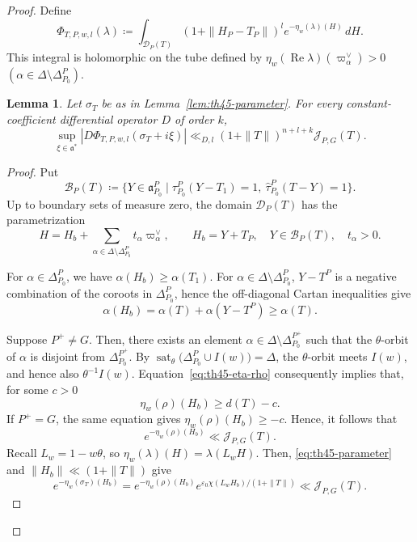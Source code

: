 \documentclass[12pt]{amsart}
\theoremstyle{definition}
\theoremstyle{plain}
\newtheorem{lemma}[definition]{Lemma}
\theoremstyle{remark}
\newcommand{\fa}{\mathfrak{a}}
\newcommand{\cJ}{\mathcal{J}}
\numberwithin{equation}{section}
\begin{document}
\begin{proof}
Define
\[
 \Phi_{T,P,w,l}(\lambda)
 \coloneqq \int_{\mathcal D_P(T)}
   (1+\|H_P-T_P\|)^l e^{-\eta_w(\lambda)(H)}\,dH.
\]
This integral is holomorphic on the tube defined by $\eta_w(\operatorname{Re}\lambda)(\varpi_\alpha^\vee)>0$ $(\alpha\in\Delta\setminus\Delta_{P_0}^P)$. 
\begin{lemma}
\label{lem:th45-cone}
Let $\sigma_T$ be as in Lemma~\ref{lem:th45-parameter}. 
For every constant-coefficient differential operator \(D\) of
order \(k\),
\begin{equation}\label{eq:th45-cone-bound}
 \sup_{\xi\in\fa^*}
 |D\Phi_{T,P,w,l}(\sigma_T+i\xi)|
 \ll_{D,l} (1+\|T\|)^{n+l+k}\cJ_{P,G}(T).
\end{equation}
\end{lemma}

\begin{proof}
Put
\[
 \mathcal B_P(T)\coloneqq
 \{Y\in\fa_{P_0}^P\mid
   \tau_{P_0}^P(Y-T_1)=1,\ 
   \widehat\tau_{P_0}^P(T-Y)=1\}.
\]
Up to boundary sets of measure zero, the domain \(\mathcal D_P(T)\)
has the parametrization
\begin{equation}\label{eq:th45-cone-coordinates}
 H=H_b+\sum_{\alpha\in\Delta\setminus\Delta_{P_0}^P}
               t_\alpha\varpi_\alpha^\vee,
 \qquad H_b=Y+T_P,\quad Y\in\mathcal B_P(T),\quad t_\alpha>0.
\end{equation}


For $\alpha\in\Delta_{P_0}^P$, we have $\alpha(H_b)\geq\alpha(T_1)$.
For $\alpha\in\Delta\setminus \Delta_{P_0}^P$, $Y-T^P$ is a negative combination of the coroots in
$\Delta_{P_0}^P$, hence the off-diagonal Cartan inequalities give
\[
 \alpha(H_b)=\alpha(T)+\alpha(Y-T^P)\geq\alpha(T).
\]


Suppose $P^+\neq G$. 
Then, there exists an element $\alpha\in\Delta\setminus \Delta_{P_0}^{P^+}$ such that the $\theta$-orbit of $\alpha$ is disjoint from $\Delta_{P_0}^{P^+}$.
By $\operatorname{sat}_\theta\bigl(\Delta_{P_0}^P\cup I(w)\bigr)=\Delta$, the $\theta$-orbit meets $I(w)$, and hence also
$\theta^{-1}I(w)$.
Equation~\eqref{eq:th45-eta-rho} consequently implies that, for some $c>0$
\[
\eta_w(\rho)(H_b)\geq d(T)-c. 
\]
If $P^+=G$, the same equation gives $\eta_w(\rho)(H_b)\geq-c$. 
Hence, it follows that
\[
 e^{-\eta_w(\rho)(H_b)}\ll\mathcal J_{P,G}(T).
\]
Recall $L_w= 1-w\theta$, so $\eta_w(\lambda)(H)=\lambda(L_wH)$.
Then, \eqref{eq:th45-parameter} and $\|H_b\|\ll (1+\|T\|)$ give
\begin{equation}\label{eq:th45-base-bound}
 e^{-\eta_w(\sigma_T)(H_b)}
 =e^{-\eta_w(\rho)(H_b)}
   e^{\varepsilon_0\chi(L_wH_b)/(1+\|T\|)}
 \ll\mathcal J_{P,G}(T).
\end{equation}


\end{proof}
\end{proof}
\end{document}
